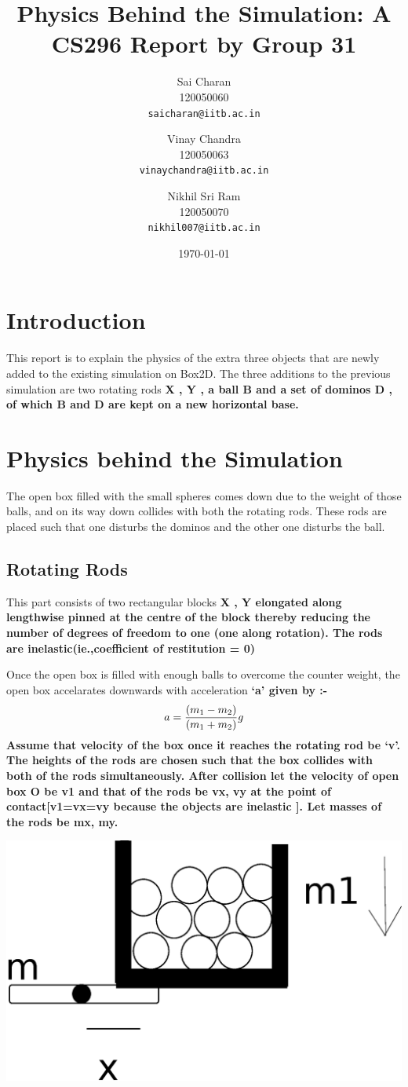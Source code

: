 \documentclass[11pt]{article}
\title{Physics Behind the Simulation: A CS296 Report by Group 31}
\author{Sai Charan\\
  120050060\\
  \texttt{saicharan@iitb.ac.in}\and
  Vinay Chandra\\
  120050063\\
  \texttt{vinaychandra@iitb.ac.in}\and
  Nikhil Sri Ram\\
  120050070\\
  \texttt{nikhil007@iitb.ac.in}\\
}
\date{\today}
\begin{document}
\maketitle
\section{Introduction}
This report is to explain the physics of the extra three objects that are newly added to the existing simulation on Box2D. The three additions to the previous simulation are  two rotating rods \bf X \rm, \bf Y \rm, a ball \bf B \rm and a set of dominos \bf D \rm, of which \bf B \rm and \bf D \rm are kept on a new horizontal base.

\section{Physics behind the Simulation}
The open box filled with the small spheres comes down due to the weight of those balls, and on its way down collides with both the rotating rods. These rods are placed such that one disturbs the dominos and the other one disturbs the ball.

\subsection{Rotating Rods}
This part consists of two rectangular blocks \bf X \rm, \bf Y \rm elongated along lengthwise pinned at the centre of the block thereby reducing the number of degrees of freedom to one (one along rotation). The rods are inelastic(ie.,coefficient of restitution = 0) 

Once the open box is filled with enough balls to overcome the counter weight, the open box accelarates downwards with acceleration \bf `a' \rm  given by :-\begin{equation} a = {(m_1-m_2)\over (m_1+m_2)} g \end{equation}
Assume that velocity of the box once it reaches the rotating rod be \bf`v'\rm. The heights of the rods are chosen such that the box collides with both of the rods simultaneously. After collision let the velocity of open box \bf O \rm be v1 and that of the rods be vx, vy at the point of contact[v1=vx=vy because the objects are inelastic \cite{rsk}]. Let masses of the rods be mx, my.

\centerline{\includegraphics[scale=0.1]{1}}
\end{document}
